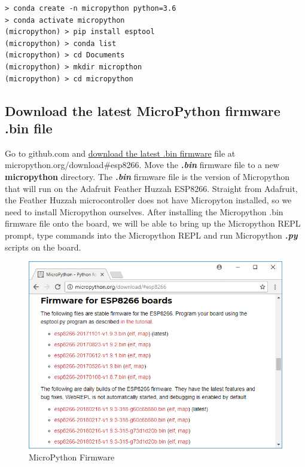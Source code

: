 \documentclass{book}
\makeatletter
\def\maxwidth{\ifdim\Gin@nat@width>\linewidth\linewidth
    \else\Gin@nat@width\fi}
\let\Oldincludegraphics\includegraphics
\renewcommand{\includegraphics}[1]{\Oldincludegraphics[width=.8\maxwidth]{#1}}
\makeatother
\begin{document}
\begin{lstlisting}
> conda create -n micropython python=3.6
> conda activate micropython
(micropython) > pip install esptool
(micropython) > conda list
(micropython) > cd Documents
(micropython) > mkdir micropthon
(micropython) > cd micropython
\end{lstlisting}

    \subsection{Download the latest MicroPython firmware .bin
file}\label{download-the-latest-micropython-firmware-.bin-file}

    Go to github.com and
\href{https://micropython.org/download\#esp8266}{download the latest
.bin firmware} file at micropython.org/download\#esp8266. Move the
\textbf{\emph{.bin}} firmware file to a new \textbf{micropython}
directory. The \textbf{\emph{.bin}} firmware file is the version of
Micropython that will run on the Adafruit Feather Huzzah ESP8266.
Straight from Adafruit, the Feather Huzzah microcontroller does not have
Micropyton installed, so we need to install Micropython ourselves. After
installing the Micropython .bin firmware file onto the board, we will be
able to bring up the Micropython REPL prompt, type commands into the
Micropython REPL and run Micropython \textbf{\emph{.py}} scripts on the
board.

\begin{figure}
\centering
\includegraphics{images/firmware_download_page.PNG}
\caption{MicroPython Firmware}
\end{figure}
\end{document}
